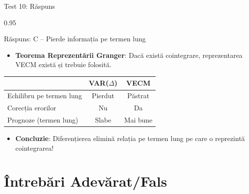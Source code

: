 \documentclass[9pt, aspectratio=169, t]{beamer}
\begin{document}
\begin{frame}{Test 10: Răspuns}
    \begin{cminipage}{0.95\textwidth}
    \begin{exampleblock}{Răspuns: C -- Pierde informația pe termen lung}
        \begin{itemize}\setlength{\itemsep}{0pt}
            \item \textbf{Teorema Reprezentării Granger}: Dacă există cointegrare, reprezentarea VECM există și trebuie folosită.
        \end{itemize}

        \vspace{0.2cm}
        \begin{center}
        \begin{tabular}{lcc}
            \toprule
            & \textbf{VAR($\Delta$)} & \textbf{VECM} \\
            \midrule
            Echilibru pe termen lung & Pierdut & Păstrat \\
            Corecția erorilor & Nu & Da \\
            Prognoze (termen lung) & Slabe & Mai bune \\
            \bottomrule
        \end{tabular}
        \end{center}

        \vspace{0.2cm}
        \begin{itemize}\setlength{\itemsep}{0pt}
            \item \textbf{Concluzie}: Diferențierea elimină relația pe termen lung pe care o reprezintă cointegrarea!
        \end{itemize}
    \end{exampleblock}
    \end{cminipage}
\end{frame}

\section{Întrebări Adevărat/Fals}
\end{document}
